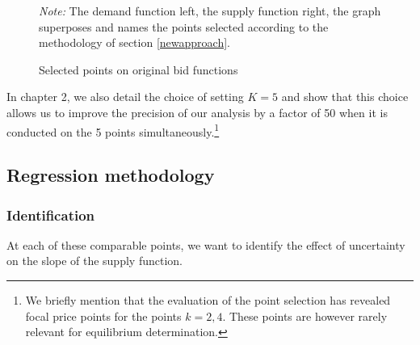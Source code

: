 \begin{figure}[!ht]
\begin{center} 
\end{center}
\caption{Selected points on original bid functions}
\emph{Note: } The demand function left, the supply function right, the graph superposes and names the points selected according to the methodology of section \ref{newapproach}.
\label{TypeallocK}
\end{figure}
 
In chapter 2, we also detail the choice of setting $K=5$ and show that this choice allows us to improve the precision of our analysis by a factor of 50 when it is conducted on the 5 points simultaneously.\footnote{We briefly mention that the evaluation of the point selection has revealed focal price points for the points $k=2,4$. These points are however rarely relevant for equilibrium determination.}



\subsection{Regression methodology}
\subsubsection{Identification}
\label{identification}
At each of these comparable points, %
we want to identify the effect of uncertainty on the slope of the supply function. \\%

